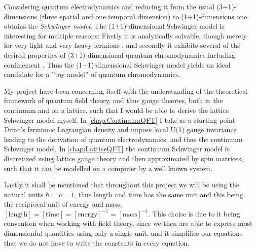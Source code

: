 \documentclass[../main.tex]{subfiles} %
\begin{document}
Considering quantum electrodynamics and reducing it from the usual (3+1)-dimensions (three spatial and one temporal dimension) to (1+1)-dimensions one obtains the \emph{Schwinger model}. The (1+1)-dimensional Schwinger model is interesting for multiple reasons: Firstly it is analytically solvable, though merely for very light and very heavy fermions \cite{crewther_eigenvalueForSchwingerModel_1980}, and secondly it exhibits several of the desired properties of (3+1)-dimensional quantum chromodynamics including confinement \cite{hamer_massiveSchwingerModelOnLattice_1982}. Thus the (1+1)-dimensional Schwinger model yields an ideal candidate for a ''toy model'' of quantum chromodynamics.

My project have been concerning itself with the understanding of the theoretical framework of quantum field theory, and thus gauge theories, both in the continuum and on a lattice, such that I would be able to derive the lattice Schwinger model myself. In \cref{chap:ContinuumQFT} I take as a starting point Dirac's fermionic Lagrangian density and impose local U(1) gauge invariance leading to the derivation of quantum electrodynamics, and thus the continuum Schwinger model. In \cref{chap:LatticeQFT} the continuum Schwinger model is discretized using lattice gauge theory and then approximated by spin matrices, such that it can be modelled on a computer by a well known system. %

Lastly it shall be mentioned that throughout this project we will be using the natural units $\hbar = c = 1$, thus length and time has the same unit and this being the reciprocal unit of energy and mass, $[\mathrm{length}] = [\mathrm{time}] = [\mathrm{energy}]^{-1} = [\mathrm{mass}]^{-1}$. This choise is due to it being convention when working with field theory, since we then are able to express most dimensionful quantities using only a single unit, and it simplifies our equations that we do not have to write the constants in every equation.
\end{document}
